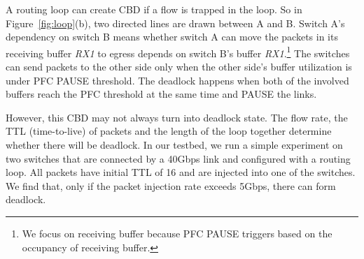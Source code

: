 
A routing loop can create CBD if a flow is trapped in the loop.
 So in Figure~\ref{fig:loop}(b), two directed lines are drawn between A and B.
Switch A's dependency on switch B means whether switch A can move
the packets in its receiving buffer {\em RX1} to egress depends on switch B's buffer {\em RX1}.\footnote{We
focus on receiving buffer because PFC PAUSE triggers based on the occupancy of receiving buffer.}
The switches can send packets to the other side only
when the other side's buffer utilization is under PFC PAUSE threshold. The deadlock happens when
both of the involved buffers reach the PFC threshold at the same time and PAUSE the links.


However, this CBD may not always turn into deadlock state. The flow
 rate, the TTL (time-to-live) of packets and the length of the loop together
determine whether there will be deadlock. In our testbed, we run a simple experiment on
two switches that are connected by a 40Gbps link and configured with a routing loop.
All packets have initial TTL of 16 and are injected into one of the switches. We find that,
only if the packet injection rate exceeds 5Gbps, there can form deadlock.

